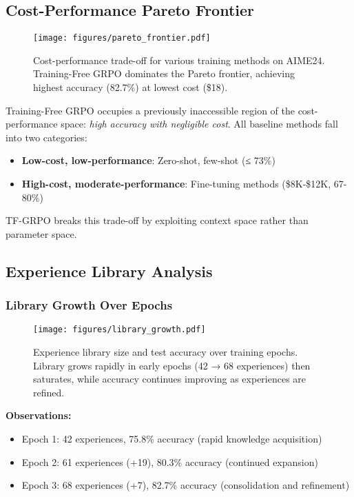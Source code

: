 \documentclass[11pt,a4paper]{article}
\begin{document}
\subsection{Cost-Performance Pareto Frontier}

\begin{figure}[h]
\centering
\texttt{[image: figures/pareto\_frontier.pdf]}
\caption{Cost-performance trade-off for various training methods on AIME24. Training-Free GRPO dominates the Pareto frontier, achieving highest accuracy (82.7\%) at lowest cost (\$18).}
\label{fig:pareto}
\end{figure}

Training-Free GRPO occupies a previously inaccessible region of the cost-performance space: \textit{high accuracy with negligible cost}. All baseline methods fall into two categories:
\begin{itemize}
    \item \textbf{Low-cost, low-performance}: Zero-shot, few-shot (≤ 73\%)
    \item \textbf{High-cost, moderate-performance}: Fine-tuning methods (\$8K-\$12K, 67-80\%)
\end{itemize}

TF-GRPO breaks this trade-off by exploiting context space rather than parameter space.

\subsection{Experience Library Analysis}

\subsubsection{Library Growth Over Epochs}

\begin{figure}[h]
\centering
\texttt{[image: figures/library\_growth.pdf]}
\caption{Experience library size and test accuracy over training epochs. Library grows rapidly in early epochs (42 → 68 experiences) then saturates, while accuracy continues improving as experiences are refined.}
\label{fig:library_growth}
\end{figure}

\textbf{Observations:}
\begin{itemize}
    \item Epoch 1: 42 experiences, 75.8\% accuracy (rapid knowledge acquisition)
    \item Epoch 2: 61 experiences (+19), 80.3\% accuracy (continued expansion)
    \item Epoch 3: 68 experiences (+7), 82.7\% accuracy (consolidation and refinement)
\end{itemize}
\end{document}
